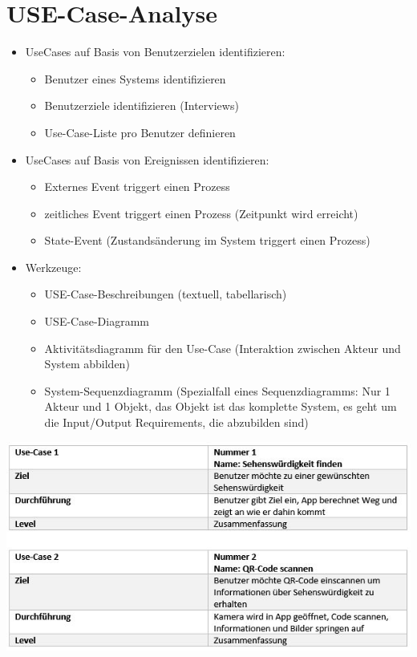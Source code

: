 \section{USE-Case-Analyse}
\begin{itemize}
	\item UseCases auf Basis von Benutzerzielen identifizieren: 
	\begin{itemize}
		\item Benutzer eines Systems identifizieren
		\item Benutzerziele identifizieren (Interviews)
		\item Use-Case-Liste pro Benutzer definieren
	\end{itemize}
	\item UseCases auf Basis von Ereignissen identifizieren: 
	\begin{itemize}
		\item Externes Event triggert einen Prozess
		\item zeitliches Event triggert einen Prozess (Zeitpunkt wird erreicht) 
		\item State-Event (Zustandsänderung im System triggert einen Prozess)
	\end{itemize}
	\item Werkzeuge:
	\begin{itemize}
		\item USE-Case-Beschreibungen (textuell, tabellarisch)
		\item USE-Case-Diagramm
		\item Aktivitätsdiagramm für den Use-Case (Interaktion zwischen Akteur und System abbilden)
		\item System-Sequenzdiagramm (Spezialfall eines Sequenzdiagramms: Nur 1 Akteur und 1 Objekt, das Objekt ist das komplette System, es geht um die Input/Output Requirements, die abzubilden sind)
	\end{itemize}
\end{itemize}
\includegraphics[width=15cm]{usecasetabelle}\\\\\\
